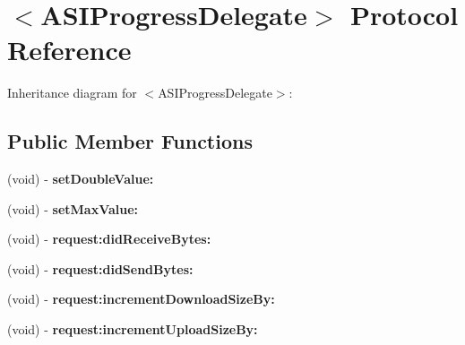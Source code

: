 \hypertarget{protocol_a_s_i_progress_delegate-p}{
\section{$<$\-A\-S\-I\-Progress\-Delegate$>$ \-Protocol \-Reference}
\label{protocol_a_s_i_progress_delegate-p}
}


\-Inheritance diagram for $<$\-A\-S\-I\-Progress\-Delegate$>$\-:
\subsection*{\-Public \-Member \-Functions}
\begin{DoxyCompactItemize}
\item 
\hypertarget{protocol_a_s_i_progress_delegate-p_a32e73672e12606d7f4342bd14806c3f5}{
(void) -\/ {\bfseries set\-Double\-Value\-:}}
\label{protocol_a_s_i_progress_delegate-p_a32e73672e12606d7f4342bd14806c3f5}

\item 
\hypertarget{protocol_a_s_i_progress_delegate-p_a60eb43d2bc99f218dcbd62c5d21c91fd}{
(void) -\/ {\bfseries set\-Max\-Value\-:}}
\label{protocol_a_s_i_progress_delegate-p_a60eb43d2bc99f218dcbd62c5d21c91fd}

\item 
\hypertarget{protocol_a_s_i_progress_delegate-p_a4a869a6713f1298f36690021d5eea8ce}{
(void) -\/ {\bfseries request\-:did\-Receive\-Bytes\-:}}
\label{protocol_a_s_i_progress_delegate-p_a4a869a6713f1298f36690021d5eea8ce}

\item 
\hypertarget{protocol_a_s_i_progress_delegate-p_a4e55ec0965b53312ed302bcc2e51bf80}{
(void) -\/ {\bfseries request\-:did\-Send\-Bytes\-:}}
\label{protocol_a_s_i_progress_delegate-p_a4e55ec0965b53312ed302bcc2e51bf80}

\item 
\hypertarget{protocol_a_s_i_progress_delegate-p_a0d003818a1c6d538bd6d3aacec2edbc0}{
(void) -\/ {\bfseries request\-:increment\-Download\-Size\-By\-:}}
\label{protocol_a_s_i_progress_delegate-p_a0d003818a1c6d538bd6d3aacec2edbc0}

\item 
\hypertarget{protocol_a_s_i_progress_delegate-p_abb842bb6486629696f59df621ccbafc1}{
(void) -\/ {\bfseries request\-:increment\-Upload\-Size\-By\-:}}
\label{protocol_a_s_i_progress_delegate-p_abb842bb6486629696f59df621ccbafc1}


\end{DoxyCompactItemize}
